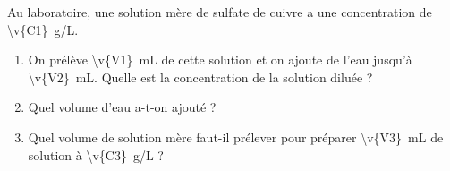 Au laboratoire, une solution mère de sulfate de cuivre a une concentration de \qty{\v{C1}}{g/L}.

\begin{enumerate}[label=\alph*)]
    \item On prélève \qty{\v{V1}}{mL} de cette solution et on ajoute de l'eau jusqu'à \qty{\v{V2}}{mL}. Quelle est la concentration de la solution diluée ?
    \item Quel volume d'eau a-t-on ajouté ?
    \item Quel volume de solution mère faut-il prélever pour préparer \qty{\v{V3}}{mL} de solution à \qty{\v{C3}}{g/L} ?
\end{enumerate}
